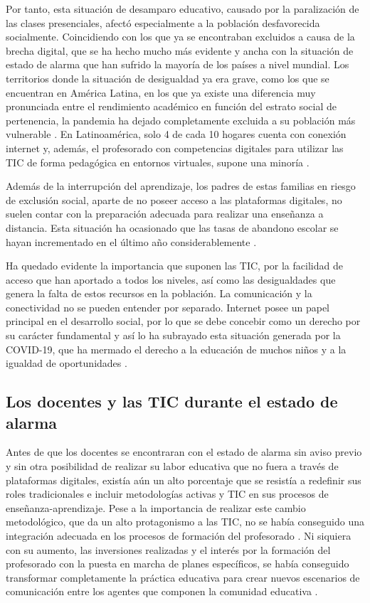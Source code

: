 \documentclass{textolivre}
\begin{document}
Por tanto, esta situación de desamparo educativo, causado por la paralización de las clases presenciales, afectó especialmente a la población desfavorecida socialmente. Coincidiendo con los que ya se encontraban excluidos a causa de la brecha digital, que se ha hecho mucho más evidente y ancha con la situación de estado de alarma que han sufrido la mayoría de los países a nivel mundial. Los territorios donde la situación de desigualdad ya era grave, como los que se encuentran en América Latina, en los que ya existe una diferencia muy pronunciada entre el rendimiento académico en función del estrato social de pertenencia, la pandemia ha dejado completamente excluida a su población más vulnerable \cite{alvarez-gardyn2020, barbozacid2020}. En Latinoamérica, solo 4 de cada 10 hogares cuenta con conexión internet y, además, el profesorado con competencias digitales para utilizar las TIC de forma pedagógica en entornos virtuales, supone una minoría \cite{murillo2020}.

Además de la interrupción del aprendizaje, los padres de estas familias en riesgo de exclusión social, aparte de no poseer acceso a las plataformas digitales, no suelen contar con la preparación adecuada para realizar una enseñanza a distancia. Esta situación ha ocasionado que las tasas de abandono escolar se hayan incrementado en el último año considerablemente \cite{murillo2020}.

Ha quedado evidente la importancia que suponen las TIC, por la facilidad de acceso que han aportado a todos los niveles, así como las desigualdades que genera la falta de estos recursos en la población. La comunicación y la conectividad no se pueden entender por separado. Internet posee un papel principal en el desarrollo social, por lo que se debe concebir como un derecho por su carácter fundamental y así lo ha subrayado esta situación generada por la COVID-19, que ha mermado el derecho a la educación de muchos niños y a la igualdad de oportunidades \cite{martinezlopez2020}.

\subsection{Los docentes y las TIC durante el estado de alarma}
Antes de que los docentes se encontraran con el estado de alarma sin aviso previo y sin otra posibilidad de realizar su labor educativa que no fuera a través de plataformas digitales, existía aún un alto porcentaje que se resistía a redefinir sus roles tradicionales e incluir metodologías activas y TIC en sus procesos de enseñanza-aprendizaje. Pese a la importancia de realizar este cambio metodológico, que da un alto protagonismo a las TIC, no se había conseguido una integración adecuada en los procesos de formación del profesorado \cite{rodriguezgarcia2018}. Ni siquiera con su aumento, las inversiones realizadas y el interés por la formación del profesorado con la puesta en marcha de planes específicos, se había conseguido transformar completamente la práctica educativa para crear nuevos escenarios de comunicación entre los agentes que componen la comunidad educativa \cite{caberoalmenara2017}.
\end{document}
